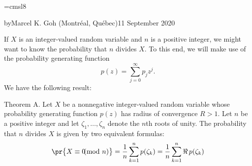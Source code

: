 



\classicmode

\def\Res{\op{Res}}

\font\eightsl=cmsl8

{by}{Marcel K. Goh (\rm Montr\'eal, Qu\'ebec)}{11 September 2020}

\medskip

\noindent If $X$ is an integer-valued random variable and $n$ is a positive integer, we might want to know
the probability that $n$ divides $X$. To this end, we will make use of the probability generating
function
$$p(z) = \sum_{j=0}^\infty p_jz^j.$$
We have the following result:

\proclaim Theorem A. Let $X$ be a nonnegative integer-valued random variable whose probability generating function
$p(z)$ has radius of convergence $R>1$. Let $n$ be a positive integer and let $\zeta_1,\ldots,\zeta_n$ denote the
$n$th roots of unity. The probability that $n$ divides $X$ is given by two equivalent formulas:
$$\pr\big\{X \equiv 0 \!\!\!\!\pmod{n}\big\}
   = {1\over n}\sum_{k=1}^n p(\zeta_k) = {1\over n}\sum_{k=1}^n \Re\,p(\zeta_k)$$

